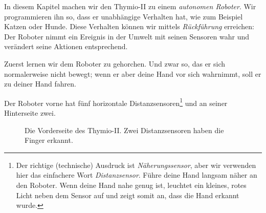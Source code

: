 \label{ch.pet}

In diesem Kapitel machen wir den Thymio-II zu einem \emph{autonomen Roboter}.
Wir programmieren ihn so, dass er unabhängige Verhalten hat, wie zum Beispiel
Katzen oder Hunde. Diese Verhalten können wir mittels \textit{Rückführung}
erreichen: Der Roboter nimmt ein Ereignis in der Umwelt mit seinen Sensoren
wahr und verändert seine Aktionen entsprechend.


Zuerst lernen wir dem Roboter zu gehorchen. Und zwar so, das er sich
normalerweise nicht bewegt; wenn er aber deine Hand vor sich wahrnimmt, soll er
zu deiner Hand fahren.

Der Roboter vorne hat fünf horizontale Distanzsensoren\footnote{Der richtige
 (technische) Ausdruck ist \emph{Näherungssensor}, aber wir verwenden hier
 das einfachere Wort \emph{Distanzsensor}. Führe deine Hand langsam näher an
 den Roboter. Wenn deine Hand nahe genug ist, leuchtet ein kleines, rotes
Licht neben dem Sensor auf und zeigt somit an, dass die Hand erkannt wurde.}
und an seiner Hinterseite zwei. 

\begin{figure}
\begin{center}
\caption{Die Vorderseite des Thymio-II. Zwei Distanzsensoren haben die Finger
erkannt.}
\label{fig.detect}
\end{center}
\end{figure}

